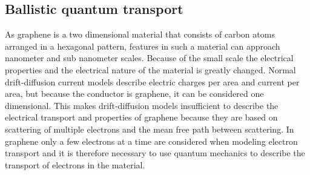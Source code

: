 \subsection{Ballistic quantum transport}
As graphene is a two dimensional material that consists of carbon atoms arranged in a hexagonal pattern, features in such a material can approach nanometer and sub nanometer scales. Because of the small scale the electrical properties and the electrical nature of the material is greatly changed. Normal drift-diffusion current models describe electric charges per area and current per area, but because the conductor is graphene, it can be considered one dimensional. This makes drift-diffusion models insufficient to describe the electrical transport and properties of graphene because they are based on scattering of multiple electrons and the mean free path between scattering. In graphene only a few electrons at a time are considered when modeling electron transport and it is therefore necessary to use quantum mechanics to describe the transport of electrons in the material.
